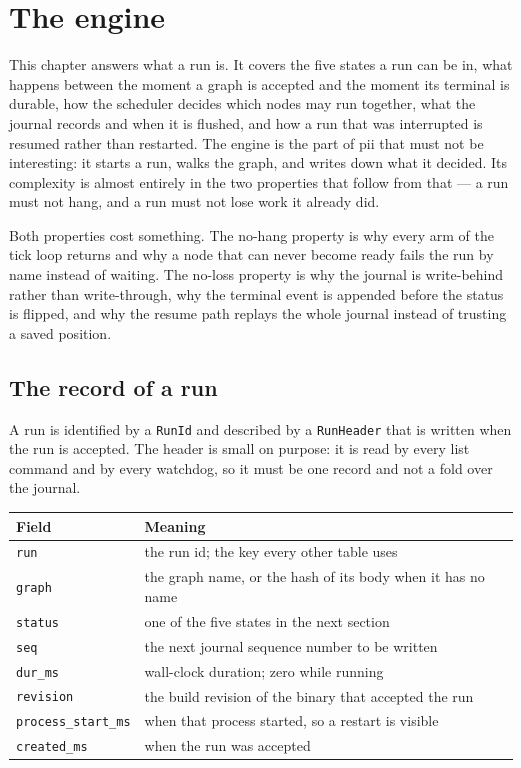 \chapter{The engine}

\label{ch:engine}

This chapter answers what a run is. It covers the five states a run can be in, what happens between
the moment a graph is accepted and the moment its terminal is durable, how the scheduler decides
which nodes may run together, what the journal records and when it is flushed, and how a run that
was interrupted is resumed rather than restarted. The engine is the part of pii that must not be
interesting: it starts a run, walks the graph, and writes down what it decided. Its complexity is
almost entirely in the two properties that follow from that --- a run must not hang, and a run must
not lose work it already did.

Both properties cost something. The no-hang property is why every arm of the tick loop returns and
why a node that can never become ready fails the run by name instead of waiting. The no-loss
property is why the journal is write-behind rather than write-through, why the terminal event is
appended before the status is flipped, and why the resume path replays the whole journal instead of
trusting a saved position.

\section{The record of a run}

A run is identified by a \texttt{RunId} and described by a \texttt{RunHeader} that is written when
the run is accepted. The header is small on purpose: it is read by every list command and by every
watchdog, so it must be one record and not a fold over the journal.

\begin{center}
\footnotesize
\begin{tabular}{@{}p{}p{}@{}}
	\toprule
	\textbf{Field} & \textbf{Meaning} \\
	\midrule
	\texttt{run} & the run id; the key every other table uses \\
	\texttt{graph} & the graph name, or the hash of its body when it has no name \\
	\texttt{status} & one of the five states in the next section \\
	\texttt{seq} & the next journal sequence number to be written \\
	\texttt{dur\_ms} & wall-clock duration; zero while running \\
	\texttt{revision} & the build revision of the binary that accepted the run \\
	\texttt{process\_start\_ms} & when that process started, so a restart is visible \\
	\texttt{created\_ms} & when the run was accepted \\
	\bottomrule
\end{tabular}
\end{center}

